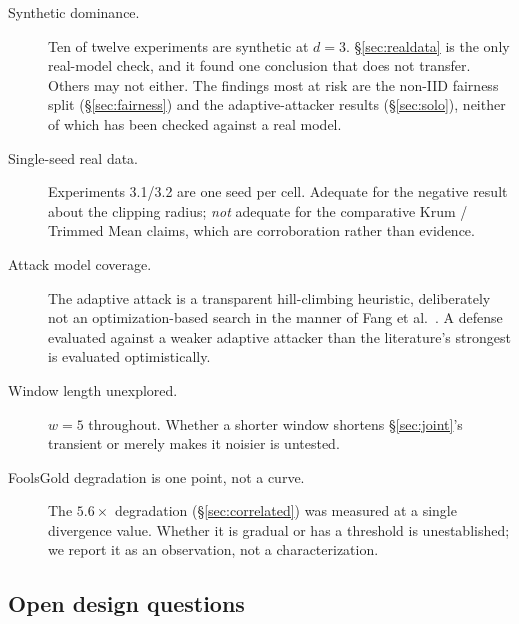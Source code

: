 \documentclass[11pt,a4paper]{article}
\begin{document}
\begin{description}
  \item[Synthetic dominance.] Ten of twelve experiments are synthetic at
    $d=3$. \S\ref{sec:realdata} is the only real-model check, and it found
    one conclusion that does not transfer. Others may not either. The
    findings most at risk are the non-IID fairness split
    (\S\ref{sec:fairness}) and the adaptive-attacker results
    (\S\ref{sec:solo}), neither of which has been checked against a real
    model.

  \item[Single-seed real data.] Experiments 3.1/3.2 are one seed per cell.
    Adequate for the negative result about the clipping radius; \emph{not}
    adequate for the comparative Krum / Trimmed Mean claims, which are
    corroboration rather than evidence.

  \item[Attack model coverage.] The adaptive attack is a transparent
    hill-climbing heuristic, deliberately not an optimization-based search
    in the manner of Fang et al.~\cite{fang2020}. A defense evaluated
    against a weaker adaptive attacker than the literature's strongest is
    evaluated optimistically.

  \item[Window length unexplored.] $w=5$ throughout. Whether a shorter
    window shortens \S\ref{sec:joint}'s transient or merely makes it
    noisier is untested.

  \item[FoolsGold degradation is one point, not a curve.] The
    $5.6\times$ degradation (\S\ref{sec:correlated}) was measured at a
    single divergence value. Whether it is gradual or has a threshold is
    unestablished; we report it as an observation, not a characterization.
\end{description}

\subsection{Open design questions}
\end{document}
